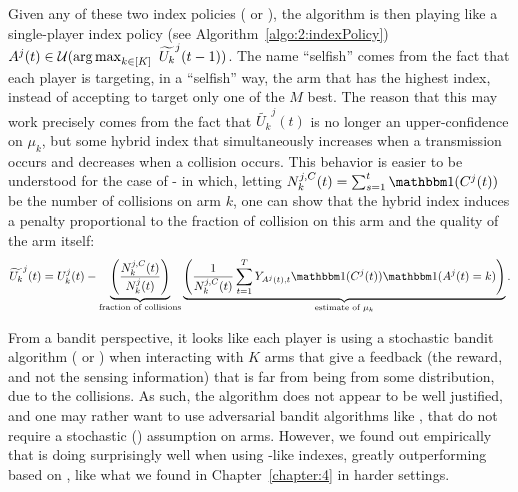 Given any of these two index policies (\UCB{} or \klUCB), the \Selfish{} algorithm is then playing like a single-player index policy (see Algorithm~\ref{algo:2:indexPolicy})
$A^j(t) \in \cU(\argmax_{ k \in [K]} \ \widetilde{U_k}^j(t-1))$.
The name ``selfish'' comes from the fact that each player is targeting, in a ``selfish'' way, the arm that has the highest index, instead of accepting to target only one of the $M$ best.
The reason that this may work precisely comes from the fact that $\widetilde{U_k}^j(t)$ is no longer an upper-confidence on $\mu_k$,
but some hybrid index that simultaneously increases when a transmission occurs and decreases when a collision occurs.
%
This behavior is easier to be understood for the case of \Selfish-\UCB{} in which, letting $N_k^{j,C}(t) = \sum_{s=1}^t \indic(C^j(t))$ be the number of collisions on arm $k$, one can show that the hybrid \Selfish{} index induces a penalty proportional to the fraction of collision on this arm and the quality of the arm itself:
\begin{equation}
  \widetilde{U_k}^j(t) = U_k^j(t) -
  \underbrace{\left(\frac{N_k^{j,C}(t)}{N_k^j(t)}\right)}_{\text{fraction of collisions}}
  \underbrace{\left(\frac{1}{N_k^{j,C}(t)}\sum_{t=1}^{T}Y_{A^j(t),t} \indic(C^j(t)) \indic(A^j(t) = k)\right)}_{\text{estimate of } \mu_k }.
\end{equation}

From a bandit perspective, it looks like each player is using a stochastic bandit algorithm (\UCB{} or \klUCB) when interacting with $K$ arms that give a feedback (the reward, and not the sensing information) that is far from being \iid{} from some distribution, due to the collisions.
%
As such, the algorithm does not appear to be well justified, and one may rather want to use adversarial bandit algorithms like \ExpThree{} \citep{Auer02NonStochastic}, that do not require a stochastic (\iid) assumption on arms.
%
However, we found out empirically that \Selfish{} is doing surprisingly well when using \UCB-like indexes, greatly outperforming \Selfish{} based on \ExpThree,
like what we found in Chapter~\ref{chapter:4} in harder settings.

